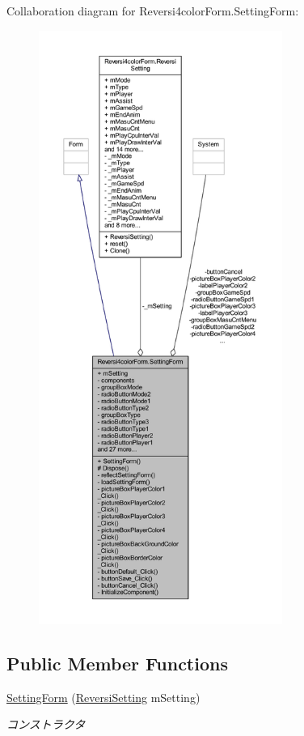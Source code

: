 Collaboration diagram for Reversi4color\+Form.\+Setting\+Form\+:\nopagebreak
\begin{figure}[H]
\begin{center}
\leavevmode
\includegraphics[height=550pt]{class_reversi4color_form_1_1_setting_form__coll__graph}
\end{center}
\end{figure}
\subsection*{Public Member Functions}
\begin{DoxyCompactItemize}
\item 
\hyperlink{class_reversi4color_form_1_1_setting_form_abad707f432da3b5a135419320dbf331d}{Setting\+Form} (\hyperlink{class_reversi4color_form_1_1_reversi_setting}{Reversi\+Setting} m\+Setting)
\begin{DoxyCompactList}\small\item\em コンストラクタ \end{DoxyCompactList}\end{DoxyCompactItemize}
